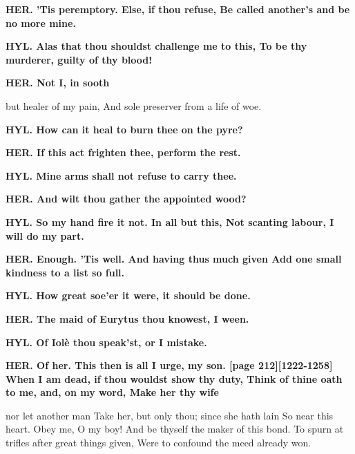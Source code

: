\documentclass[11pt,letter]{book}
\begin{document}
\par \textbf{HER. ’Tis peremptory. Else, if thou refuse, Be called another’s and be no more mine.}
\par 

\par \textbf{HYL. Alas that thou shouldst challenge me to this, To be thy murderer, guilty of thy blood!}
\par 

\par \textbf{HER. Not I, in sooth}
\par   but healer of my pain, And sole preserver from a life of woe.

\par \textbf{HYL. How can it heal to burn thee on the pyre?}
\par 

\par \textbf{HER. If this act frighten thee, perform the rest.}
\par 

\par \textbf{HYL. Mine arms shall not refuse to carry thee.}
\par 

\par \textbf{HER. And wilt thou gather the appointed wood?}
\par 

\par \textbf{HYL. So my hand fire it not. In all but this, Not scanting labour, I will do my part.}
\par 

\par \textbf{HER. Enough. ’Tis well. And having thus much given Add one small kindness to a list so full.}
\par 

\par \textbf{HYL. How great soe’er it were, it should be done.}
\par 

\par \textbf{HER. The maid of Eurytus thou knowest, I ween.}
\par 

\par \textbf{HYL. Of Iolè thou speak’st, or I mistake.}
\par 

\par \textbf{HER. Of her. This then is all I urge, my son. [page 212][1222-1258] When I am dead, if thou wouldst show thy duty, Think of thine oath to me, and, on my word, Make her thy wife}
\par   nor let another man Take her, but only thou; since she hath lain So near this heart. Obey me, O my boy! And be thyself the maker of this bond. To spurn at trifles after great things given, Were to confound the meed already won.
\end{document}
